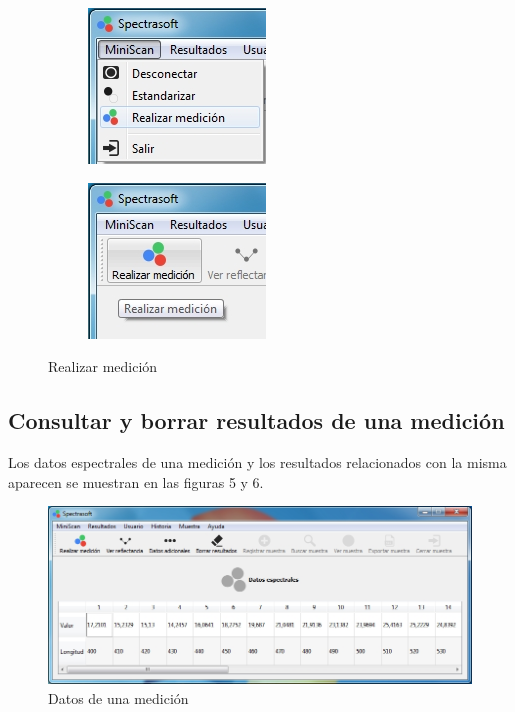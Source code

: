 \begin{figure}[H]
\centering
\begin{subfigure}{.5\textwidth}
  \centering
  \includegraphics[width=.6\linewidth]{./img/medir-menu.jpg}
\end{subfigure}%
\begin{subfigure}{.5\textwidth}
  \centering
  \includegraphics[width=.6\linewidth]{./img/medir-barra.jpg}
\end{subfigure}
\caption{Realizar medici\'{o}n}
\end{figure}

	\subsection{Consultar y borrar resultados de una medici\'{o}n}
	
	Los datos espectrales de una medici\'{o}n y los resultados relacionados con la misma aparecen se muestran en las figuras 5 y 6.
	
\begin{figure}[H]
  \centering
  \includegraphics[width=1\linewidth]{./img/resultados.jpg}
\caption{Datos de una medici\'{o}n}
\end{figure}

